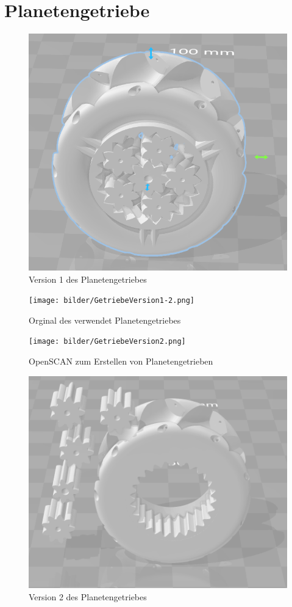 \section{Planetengetriebe}
\begin{figure}[!ht]
	\centering
	\includegraphics[width=\textwidth]{bilder/GetriebeVersion1-1.png}
	\caption{Version 1 des Planetengetriebes}
	\label{bild:gearversion1-1}
\end{figure}
\begin{figure}[!ht]
	\centering
	\texttt{[image: bilder/GetriebeVersion1-2.png]}
	\caption{Orginal des verwendet Planetengetriebes \cite{link:planetgear1}}
	\label{bild:gearversion1-2}
\end{figure}
\begin{figure}[!ht]
	\centering
	\texttt{[image: bilder/GetriebeVersion2.png]}
	\caption{OpenSCAN zum Erstellen von Planetengetrieben}
	\label{bild:gearversion2}
\end{figure}
\begin{figure}[!ht]
	\centering
	\includegraphics[width=\textwidth]{bilder/GetriebeVersion3-1.png}
	\caption{Version 2 des Planetengetriebes}
	\label{bild:gearversion3-1}
\end{figure}
